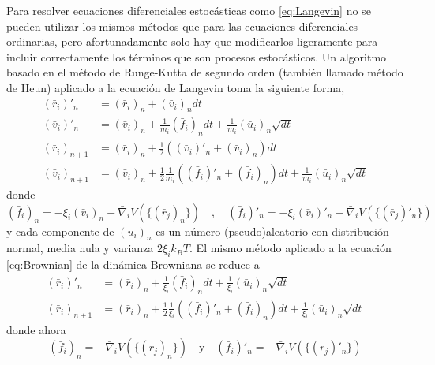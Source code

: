 Para resolver ecuaciones diferenciales estocásticas como \eqref{eq:Langevin} no se pueden utilizar los mismos métodos que para las ecuaciones diferenciales ordinarias, pero afortunadamente solo hay que modificarlos ligeramente para incluir correctamente los términos que son procesos estocásticos. Un algoritmo basado en el método de Runge-Kutta de segundo orden (también llamado método de Heun) \cite{Toral2014} aplicado a la ecuación de Langevin toma la siguiente forma,
\begin{equation}
\label{eq:RK_method}
\begin{aligned}
    (\bar{r}_i)'_{n} &= (\bar{r}_i)_n+(\bar{v}_i)_ndt\\
    (\bar{v}_i)'_{n} &= (\bar{v}_i)_n+\frac{1}{m_i}(\bar{f}_i)_ndt+\frac{1}{m_i}(\bar{u}_i)_n\sqrt{dt}\\
    (\bar{r}_i)_{n+1} &= (\bar{r}_i)_n+\frac{1}{2}\left((\bar{v}_i)'_n+(\bar{v}_i)_n\right)dt\\
    (\bar{v}_i)_{n+1} &= (\bar{v}_i)_n+\frac{1}{2}\frac{1}{m_i}\left((\bar{f}_i)'_n+(\bar{f}_i)_n\right)dt+\frac{1}{m_i}(\bar{u}_i)_n\sqrt{dt}
\end{aligned}
\end{equation}
donde
\begin{equation}
    \label{eq:RK_method_forces}
    (\bar{f}_i)_n=-\xi_i(\bar{v}_i)_n-\bar{\nabla}_iV(\{(\bar{r}_j)_n\}) \quad , \quad (\bar{f}_i)'_n=-\xi_i(\bar{v}_i)'_n-\bar{\nabla}_iV(\{(\bar{r}_j)'_n\})
\end{equation}
y cada componente de $(\bar{u}_i)_n$ es un número (pseudo)aleatorio con distribución normal, media nula y varianza $2\xi_ik_BT$. El mismo método aplicado a la ecuación \eqref{eq:Brownian} de la dinámica Browniana se reduce a
\begin{equation}
\label{eq:RK_method_Brownian}
\begin{aligned}
    (\bar{r}_i)'_{n} &= (\bar{r}_i)_n+\frac{1}{\xi_i}(\bar{f}_i)_ndt+\frac{1}{\xi_i}(\bar{u}_i)_n\sqrt{dt}\\
    (\bar{r}_i)_{n+1} &= (\bar{r}_i)_n+\frac{1}{2}\frac{1}{\xi_i}\left((\bar{f}_i)'_n+(\bar{f}_i)_n\right)dt+\frac{1}{\xi_i}(\bar{u}_i)_n\sqrt{dt}
\end{aligned}
\end{equation}
donde ahora
\begin{equation}
    \label{eq:RK_method_forces_Brownian}
    (\bar{f}_i)_n=-\bar{\nabla}_iV(\{(\bar{r}_j)_n\}) \quad \text{y} \quad (\bar{f}_i)'_n=-\bar{\nabla}_iV(\{(\bar{r}_j)'_n\})
\end{equation}

